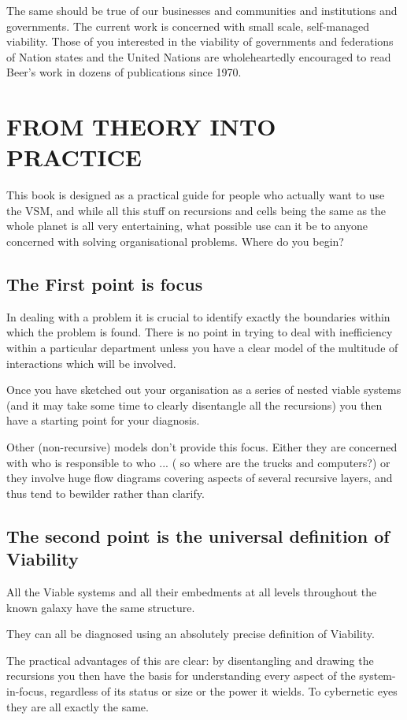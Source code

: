 The same should be true of our businesses and communities and institutions and governments. The current work is concerned with small scale, self-managed viability. Those of you interested in the viability of governments and federations of Nation states and the United Nations are wholeheartedly encouraged to read Beer's work in dozens of publications since 1970.

\section*{FROM THEORY INTO PRACTICE}
This book is designed as a practical guide for people who actually want to use the VSM, and while all this stuff on recursions and cells being the same as the whole planet is all very entertaining, what possible use can it be to anyone concerned with solving organisational problems. Where do you begin?

\subsection*{The First point is focus}
In dealing with a problem it is crucial to identify exactly the boundaries within which the problem is found. There is no point in trying to deal with inefficiency within a particular department unless you have a clear model of the multitude of interactions which will be involved.

Once you have sketched out your organisation as a series of nested viable systems (and it may take some time to clearly disentangle all the recursions) you then have a starting point for your diagnosis.

Other (non-recursive) models don't provide this focus. Either they are concerned with who is responsible to who ... ( so where are the trucks and computers?) or they involve huge flow diagrams covering aspects of several recursive layers, and thus tend to bewilder rather than clarify.

\subsection*{The second point is the universal definition of Viability}
All the Viable systems and all their embedments at all levels throughout the known galaxy have the same structure.

They can all be diagnosed using an absolutely precise definition of Viability.

The practical advantages of this are clear: by disentangling and drawing the recursions you then have the basis for understanding every aspect of the system-in-focus, regardless of its status or size or the power it wields. To cybernetic eyes they are all exactly the same.

